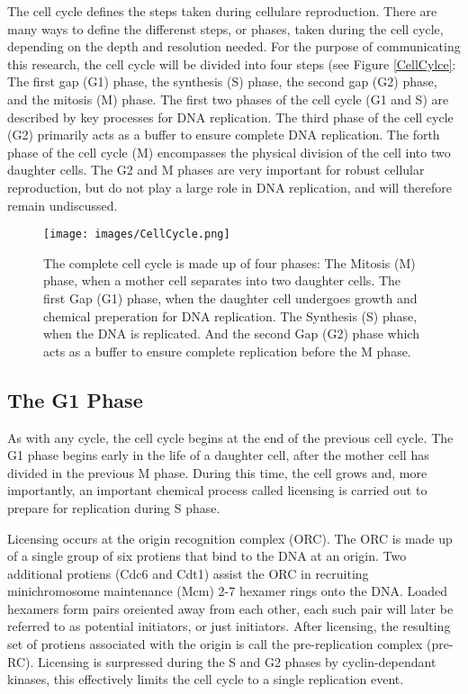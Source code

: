 \documentclass[serif]{sfuthesis}
\begin{document}
	The cell cycle defines the steps taken during cellulare reproduction.
	There are many ways to define the differenst steps, or phases, taken during the cell cycle, depending on the depth and resolution needed.
	For the purpose of communicating this research, the cell cycle will be divided into four steps (see Figure \ref{CellCylce}: The first gap (G1) phase, the synthesis (S) phase, the second gap (G2) phase, and the mitosis (M) phase.
	The first two phases of the cell cycle (G1 and S) are described by key processes for DNA replication.
	The third phase of the cell cycle (G2) primarily acts as a buffer to ensure complete DNA replication.
	The forth phase of the cell cycle (M) encompasses the physical division of the cell into two daughter cells.
	The G2 and M phases are very important for robust cellular reproduction, but do not play a large role in DNA replication, and will therefore remain undiscussed.
	
\begin{figure}[b]
	\begin{center}
		\texttt{[image: images/CellCycle.png]}
	\end{center}
	\caption[CellCycle]{\label{CellCycle} The complete cell cycle is made up of four phases: The Mitosis (M) phase, when a mother cell separates into two daughter cells. The first Gap (G1) phase, when the daughter cell undergoes growth and chemical preperation for DNA replication. The Synthesis (S) phase, when the DNA is replicated. And the second Gap (G2) phase which acts as a buffer to ensure complete replication before the M phase.}
\end{figure}
	
		\subsection{The G1 Phase}
		
		As with any cycle, the cell cycle begins at the end of the previous cell cycle.
		The G1 phase begins early in the life of a daughter cell, after the mother cell has divided in the previous M phase.
		During this time, the cell grows and, more importantly, an important chemical process called licensing is carried out to prepare for replication during S phase.
		
		Licensing occurs at the origin recognition complex (ORC).
		The ORC is made up of a single group of six protiens that bind to the DNA at an origin.
		Two additional protiens (Cdc6 and Cdt1) assist the ORC in recruiting minichromosome maintenance (Mcm) 2-7 hexamer rings onto the DNA.
		Loaded hexamers form pairs oreiented away from each other, each such pair will later be referred to as potential initiators, or just initiators.
		After licensing, the resulting set of protiens associated with the origin is call the pre-replication complex (pre-RC).
		Licensing is surpressed during the S and G2 phases by cyclin-dependant kinases, this effectively limits the cell cycle to a single replication event.\cite{MolecularCellBiology}
		
\end{document}
